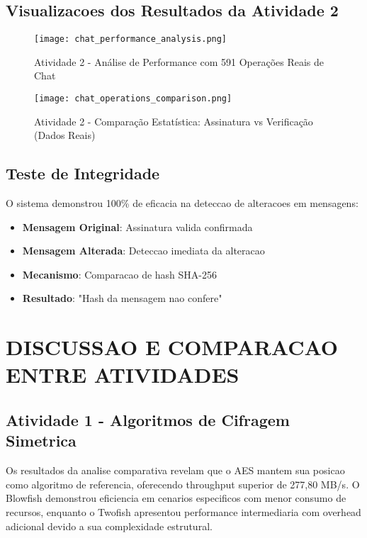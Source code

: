 \documentclass[12pt,a4paper,oneside]{article}
\begin{document}
\subsection{Visualizacoes dos Resultados da Atividade 2}

\begin{figure}[H]
\centering
\texttt{[image: chat\_performance\_analysis.png]}
\caption{Atividade 2 - Análise de Performance com 591 Operações Reais de Chat}
\label{fig:atividade2_performance_final}
\end{figure}

\begin{figure}[H]
\centering
\texttt{[image: chat\_operations\_comparison.png]}
\caption{Atividade 2 - Comparação Estatística: Assinatura vs Verificação (Dados Reais)}
\label{fig:atividade2_comparison_final}
\end{figure}

\subsection{Teste de Integridade}

O sistema demonstrou 100\% de eficacia na deteccao de alteracoes em mensagens:

\begin{itemize}
    \item \textbf{Mensagem Original}: Assinatura valida confirmada
    \item \textbf{Mensagem Alterada}: Deteccao imediata da alteracao
    \item \textbf{Mecanismo}: Comparacao de hash SHA-256
    \item \textbf{Resultado}: "Hash da mensagem nao confere"
\end{itemize}

\section{DISCUSSAO E COMPARACAO ENTRE ATIVIDADES}

\subsection{Atividade 1 - Algoritmos de Cifragem Simetrica}

Os resultados da analise comparativa revelam que o AES mantem sua posicao como algoritmo de referencia, oferecendo throughput superior de 277,80 MB/s. O Blowfish demonstrou eficiencia em cenarios especificos com menor consumo de recursos, enquanto o Twofish apresentou performance intermediaria com overhead adicional devido a sua complexidade estrutural.
\end{document}
